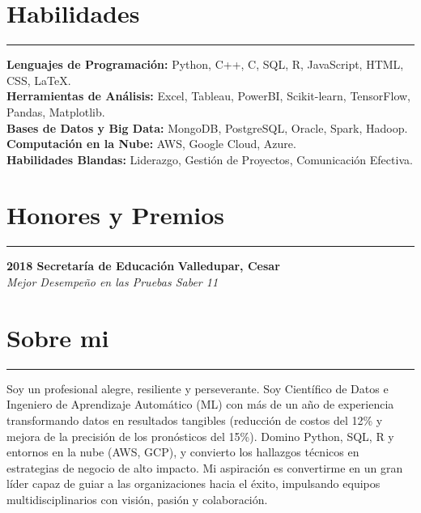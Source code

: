 \documentclass[9pt,a4paper]{article}
\newcommand{\cvevent}[4]{%
  {\noindent \textbf{#1 #2} \hfill \textbf{#3}\\%
   \textit{#4}\\[0pt]}%
}
\begin{document}
\vspace{-\baselineskip}
\vspace{-\baselineskip}


\section*{Habilidades}
\vspace{-\baselineskip}
\vspace{-\baselineskip}

\noindent\rule{\linewidth}{0.5pt}

\textbf{Lenguajes de Programación:} Python, C++, C, SQL, R, JavaScript, HTML, CSS, LaTeX.\\
\textbf{Herramientas de Análisis:} Excel, Tableau, PowerBI, Scikit-learn, TensorFlow, Pandas, Matplotlib.\\
\textbf{Bases de Datos y Big Data:} MongoDB, PostgreSQL, Oracle, Spark, Hadoop.\\
\textbf{Computación en la Nube:} AWS, Google Cloud, Azure.\\
\textbf{Habilidades Blandas:} Liderazgo, Gestión de Proyectos, Comunicación Efectiva.
\vspace{-\baselineskip}
\vspace{-\baselineskip}

\section*{Honores y Premios}
\vspace{-\baselineskip}
\vspace{-\baselineskip}

\noindent\rule{\linewidth}{0.5pt}

\cvevent{2018}{Secretaría de Educación}{Valledupar, Cesar}{Mejor Desempeño en las Pruebas Saber 11}
\vspace{-\baselineskip}
\vspace{-\baselineskip}
\vspace{-\baselineskip}


\section*{Sobre mi}
\vspace{-\baselineskip}
\vspace{-\baselineskip}
\noindent\rule{\linewidth}{0.5pt}
Soy un profesional alegre, resiliente y perseverante. Soy Científico de Datos e Ingeniero de Aprendizaje Automático (ML) con más de un año de experiencia transformando datos en resultados tangibles (reducción de costos del 12\% y mejora de la precisión de los pronósticos del 15\%). Domino Python, SQL, R y entornos en la nube (AWS, GCP), y convierto los hallazgos técnicos en estrategias de negocio de alto impacto. Mi aspiración es convertirme en un gran líder capaz de guiar a las organizaciones hacia el éxito, impulsando equipos multidisciplinarios con visión, pasión y colaboración.
\end{document}
